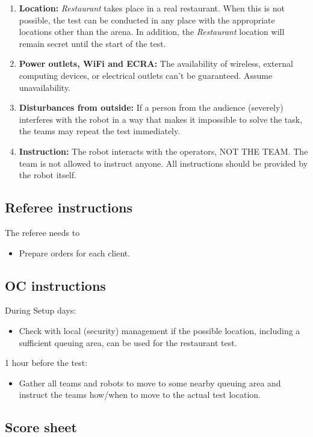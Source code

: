 \begin{enumerate}[nosep]
	\item \textbf{Location:} \emph{Restaurant} takes place in a real restaurant.
	When this is not possible, the test can be conducted in any place with the appropriate locations other than the arena.
	In addition, the \emph{Restaurant} location will remain secret until the start of the test.

	\item \textbf{Power outlets, WiFi and ECRA:} The availability of wireless, external computing devices, or electrical outlets can't be guaranteed. Assume unavailability.

	\item \textbf{Disturbances from outside:} If a person from the audience (severely) interferes with the robot in a way that makes it impossible to solve the task, the teams may repeat the test immediately.

	\item \textbf{Instruction:} The robot interacts with the operators, NOT THE TEAM.
	The team is not allowed to instruct anyone.
	All instructions should be provided by the robot itself.

\end{enumerate}

\subsection{Referee instructions}

The referee needs to
\begin{itemize}
	\item Prepare orders for each client.
\end{itemize}

\subsection{OC instructions}
During Setup days:
\begin{itemize}[nosep]
	\item Check with local (security) management if the possible location, including a sufficient queuing area, can be used for the restaurant test.
\end{itemize}

1 hour before the test:
\begin{itemize}[nosep]
	\item Gather all teams and robots to move to some nearby queuing area and instruct the teams how/when to move to the actual test location.
\end{itemize}

\newpage
\subsection{Score sheet}


\cleardoublepage



